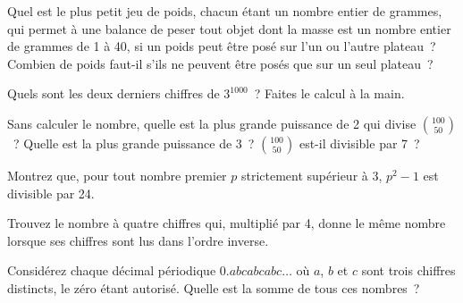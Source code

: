 \begin{question}\label{iq:iv1:number-riddles:13}
Quel est le plus petit jeu de poids, chacun étant un nombre entier de grammes, qui permet à une balance de peser tout objet dont la masse est un nombre entier de grammes de 1 à 40, si un poids peut être posé sur l'un ou l'autre plateau~? Combien de poids faut-il s'ils ne peuvent être posés que sur un seul plateau~?
\end{question}

\begin{question}\label{iq:iv1:number-riddles:14}
Quels sont les deux derniers chiffres de $3^{1000}$~? Faites le calcul à la main.
\end{question}

\begin{question}\label{iq:iv1:number-riddles:15}
Sans calculer le nombre, quelle est la plus grande puissance de 2 qui divise $\binom{100}{50}$~? Quelle est la plus grande puissance de 3~? $\binom{100}{50}$ est-il divisible par 7~?
\end{question}

\begin{question}\label{iq:iv1:number-riddles:16}
Montrez que, pour tout nombre premier $p$ strictement supérieur à 3, $p^2 - 1$ est divisible par 24.
\end{question}

\begin{question}\label{iq:iv1:number-riddles:17}
Trouvez le nombre à quatre chiffres qui, multiplié par 4, donne le même nombre lorsque ses chiffres sont lus dans l'ordre inverse.
\end{question}

\begin{question}\label{iq:iv1:number-riddles:18}
Considérez chaque décimal périodique $0.abcabcabc\dots$ où $a$, $b$ et $c$ sont trois chiffres distincts, le zéro étant autorisé. Quelle est la somme de tous ces nombres~?
\end{question}

